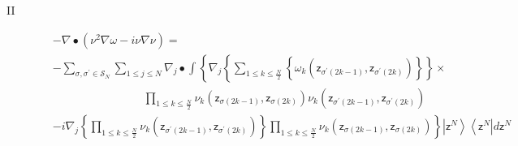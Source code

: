 \documentclass[aps,preprint]{revtex4}%
\begin{document}
\begin{description}
\item[II]
\begin{align}
&  -\nabla\bullet\left(  \nu^{2}\nabla\omega-i\nu\nabla\nu\right)  \left.
=\right. \nonumber\\
&  -%
{\displaystyle\sum\limits_{\sigma,\sigma^{\prime}\in\mathcal{S}_{N}}}
{\displaystyle\sum\limits_{1\leq j\leq N}}
\nabla_{j}\bullet\int\left\{  \nabla_{j}\left\{
{\displaystyle\sum\limits_{1\leq k\leq\frac{N}{2}}}
\left\{  \omega_{k}\left(  \mathsf{z}_{\sigma^{\prime}\left(  2k-1\right)
},\mathsf{z}_{\sigma^{\prime}\left(  2k\right)  }\right)  \right\}  \right\}
\right.  \times\nonumber\\
&  \qquad\qquad\qquad\qquad%
{\displaystyle\prod\limits_{1\leq k\leq\frac{N}{2}}}
\nu_{k}\left(  \mathsf{z}_{\sigma\left(  2k-1\right)  },\mathsf{z}%
_{\sigma\left(  2k\right)  }\right)  \nu_{k}\left(  \mathsf{z}_{\sigma
^{\prime}\left(  2k-1\right)  },\mathsf{z}_{\sigma^{\prime}\left(  2k\right)
}\right) \nonumber\\
&  \left.  -i\nabla_{j}\left\{
{\displaystyle\prod\limits_{1\leq k\leq\frac{N}{2}}}
\nu_{k}\left(  \mathsf{z}_{\sigma^{\prime}\left(  2k-1\right)  }%
,\mathsf{z}_{\sigma^{\prime}\left(  2k\right)  }\right)  \right\}
{\displaystyle\prod\limits_{1\leq k\leq\frac{N}{2}}}
\nu_{k}\left(  \mathsf{z}_{\sigma\left(  2k-1\right)  },\mathsf{z}%
_{\sigma\left(  2k\right)  }\right)  \right\}  \left\vert \mathsf{z}%
^{N}\right\rangle \left\langle \mathsf{z}^{N}\right\vert d\mathsf{z}^{N}%
\end{align}



\end{description}
\end{document}
